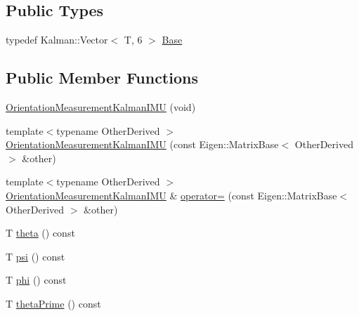 \subsection*{Public Types}
\begin{DoxyCompactItemize}
\item 
typedef Kalman\+::\+Vector$<$ T, 6 $>$ \hyperlink{classo_cpt_1_1components_1_1sensors_1_1_orientation_measurement_kalman_i_m_u_a14a44abdb42af2988bed26e3d6a3a5d4}{Base}
\end{DoxyCompactItemize}
\subsection*{Public Member Functions}
\begin{DoxyCompactItemize}
\item 
\hyperlink{classo_cpt_1_1components_1_1sensors_1_1_orientation_measurement_kalman_i_m_u_a8b369e5faee580013a25988d096f2c93}{Orientation\+Measurement\+Kalman\+I\+MU} (void)
\item 
{\footnotesize template$<$typename Other\+Derived $>$ }\\\hyperlink{classo_cpt_1_1components_1_1sensors_1_1_orientation_measurement_kalman_i_m_u_a3d730c7be246a1ea2ef3c4074f0f6ca9}{Orientation\+Measurement\+Kalman\+I\+MU} (const Eigen\+::\+Matrix\+Base$<$ Other\+Derived $>$ \&other)
\item 
{\footnotesize template$<$typename Other\+Derived $>$ }\\\hyperlink{classo_cpt_1_1components_1_1sensors_1_1_orientation_measurement_kalman_i_m_u}{Orientation\+Measurement\+Kalman\+I\+MU} \& \hyperlink{classo_cpt_1_1components_1_1sensors_1_1_orientation_measurement_kalman_i_m_u_a266796bd7b5994657cd351b92aa9c251}{operator=} (const Eigen\+::\+Matrix\+Base$<$ Other\+Derived $>$ \&other)
\item 
T \hyperlink{classo_cpt_1_1components_1_1sensors_1_1_orientation_measurement_kalman_i_m_u_a40e67cce56f1ac577ad2f0aef699aaaa}{theta} () const
\item 
T \hyperlink{classo_cpt_1_1components_1_1sensors_1_1_orientation_measurement_kalman_i_m_u_a3f9154bd8fe98787504823afd14ec2f0}{psi} () const
\item 
T \hyperlink{classo_cpt_1_1components_1_1sensors_1_1_orientation_measurement_kalman_i_m_u_a0cad53095982781c6631c31ba2282bd7}{phi} () const
\item 
T \hyperlink{classo_cpt_1_1components_1_1sensors_1_1_orientation_measurement_kalman_i_m_u_a57d5317eec50b4027ca91682a348d301}{theta\+Prime} () const

\end{DoxyCompactItemize}
